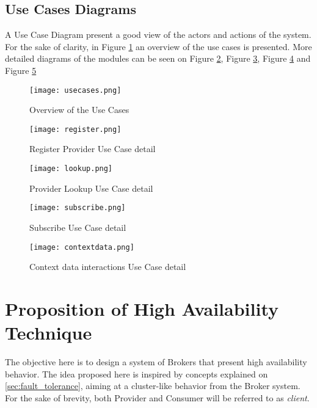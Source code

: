 \subsection{Use Cases Diagrams}
A Use Case Diagram present a good view of the actors and actions of the system.
For the sake of clarity, in Figure \ref{fig:usecases} an overview of the use cases is presented. More detailed diagrams of the modules can be seen on Figure \ref{fig:register}, Figure \ref{fig:lookup}, Figure \ref{fig:subscribe} and Figure \ref{fig:contextdata}


\begin{figure}[h]
	\centering
	\texttt{[image: usecases.png]}
	\caption{Overview of the Use Cases}
	\label{fig:usecases}
	
\end{figure}


\begin{figure}[h]
	\centering
	\texttt{[image: register.png]}
	\caption{Register Provider Use Case detail}
	\label{fig:register}
	
\end{figure}


\begin{figure}[h]
	\centering
	\texttt{[image: lookup.png]}
	\caption{Provider Lookup Use Case detail}
	\label{fig:lookup}
	
\end{figure}


\begin{figure}[h]
	\centering
	\texttt{[image: subscribe.png]}
	\caption{Subscribe Use Case detail}
	\label{fig:subscribe}
	
\end{figure}


\begin{figure}[h]
	\centering
	\texttt{[image: contextdata.png]}
	\caption{Context data interactions Use Case detail}
	\label{fig:contextdata}
	
\end{figure}

\section{Proposition of High Availability Technique}
\label{sec:ha_broker}
The objective here is to design a system of Brokers that present high availability behavior. The idea proposed here is inspired by concepts explained on \ref{sec:fault_tolerance}, aiming at a cluster-like behavior from the Broker system. For the sake of brevity, both Provider and Consumer will be referred to as \textit{client}.

